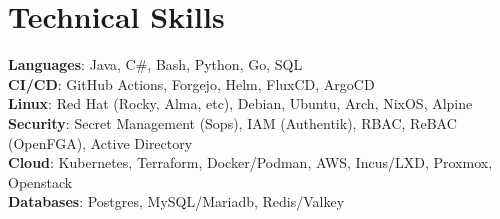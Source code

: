 \documentclass[letterpaper,11pt]{article}
\begin{document}
\section{Technical Skills}
 \begin{itemize}[leftmargin=0.15in, label={}]
    \small{\item{
     \textbf{Languages}{: Java, C\#, Bash, Python, Go, SQL} \\
     \textbf{CI/CD}{: GitHub Actions, Forgejo, Helm, FluxCD, ArgoCD} \\
     \textbf{Linux}{: Red Hat (Rocky, Alma, etc), Debian, Ubuntu, Arch, NixOS, Alpine} \\
     \textbf{Security}{: Secret Management (Sops), IAM (Authentik), RBAC, ReBAC (OpenFGA), Active Directory} \\
     \textbf{Cloud}{: Kubernetes, Terraform, Docker/Podman, AWS, Incus/LXD, Proxmox, Openstack} \\
     \textbf{Databases}{: Postgres, MySQL/Mariadb, Redis/Valkey}
    }}
 \end{itemize}


\end{document}
